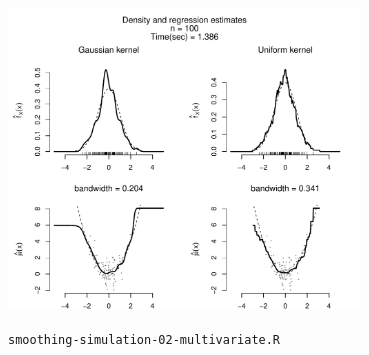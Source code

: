 \documentclass[11pt, a4paper]{article}
\begin{document}
\begin{center}
\includegraphics[width=0.7\textwidth]{output/18-density-and-regression.pdf}
\end{center}

\newpage
\centerline{\texttt{smoothing-simulation-02-multivariate.R}}
\inputminted[baselinestretch=0.9, fontsize=\footnotesize, breaklines, linenos]{R}{smoothing-simulation-02-multivariate.R}
\end{document}
